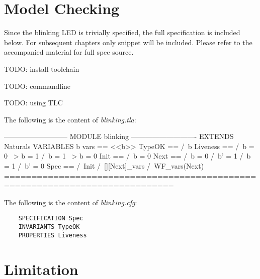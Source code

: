\documentclass{report}
\begin{document}
\section{Model Checking}

Since the blinking LED is trivially specified, the full specification is
included below. For subsequent chapters only snippet will be included. Please
refer to the accompanied material for full spec source. 

TODO: install toolchain 

TODO: commandline

TODO: using TLC

The following is the content of \textit{blinking.tla}:
\begin{tla}
--------------------------- MODULE blinking ----------------------------
EXTENDS Naturals
VARIABLES b 
vars == <<b>>
TypeOK ==
  /\ b  
Liveness == 
    /\ b = 0 ~> b = 1
    /\ b = 1 ~> b = 0
Init ==
  /\ b = 0
Next ==
  \/ /\ b = 0
     /\ b' = 1
  \/ /\ b = 1
     /\ b' = 0
Spec ==
  /\ Init
  /\ [][Next]_vars
  /\ WF_vars(Next)
=============================================================================
\end{tla}
\begin{tlatex}
\@x{}\moduleLeftDash{}\moduleRightDash\@xx{}%
%
%
%
%
%
%
%
%
%
%
%
%
%
%
%
%
%
%
%
\@x{}\bottombar\@xx{}%
\end{tlatex}

The following is the content of \textit{blinking.cfg}:

\begin{lstlisting}
    SPECIFICATION Spec
    INVARIANTS TypeOK
    PROPERTIES Liveness
\end{lstlisting}

\section{Limitation}
\end{document}
